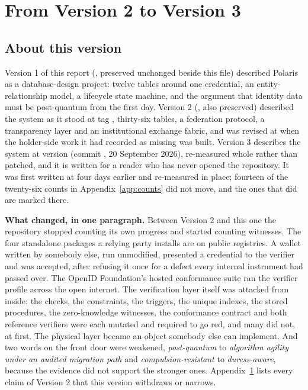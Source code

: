 \section{From Version 2 to Version 3}
\label{app:from-v2}

\subsection*{About this version}

Version 1 of this report (, preserved unchanged beside this
file) described Polaris as a database-design project: twelve tables around one credential, an
entity-relationship model, a lifecycle state machine, and the argument that identity data must be
post-quantum from the first day. Version 2 (, also preserved)
described the system as it stood at tag , thirty-six tables, a federation protocol, a
transparency layer and an institutional exchange fabric, and was revised at  when the
holder-side work it had recorded as missing was built. Version 3 describes the system at version
 (commit , 20 September 2026), re-measured whole rather than patched,
and it is written for a reader who has never opened the repository. It was first written at
 four days earlier and re-measured in place; fourteen of the twenty-six counts in
Appendix~\ref{app:counts} did not move, and the ones that did are marked there.

\textbf{What changed, in one paragraph.} Between Version 2 and this one the repository stopped
counting its own progress and started counting witnesses. The four standalone packages a relying
party installs are on public registries. A wallet written by somebody else, run unmodified,
presented a credential to the verifier and was accepted, after refusing it once for a defect every
internal instrument had passed over. The OpenID Foundation's hosted conformance suite ran the
verifier profile across the open internet. The verification layer itself was attacked from inside:
the checks, the constraints, the triggers, the unique indexes, the stored procedures, the zero-knowledge
witnesses, the conformance contract and both reference verifiers were each mutated and required to
go red, and many did not, at first. The physical layer became an object somebody else can implement.
And two words on the front door were weakened, \emph{post-quantum} to \emph{algorithm agility under an
audited migration path} and \emph{compulsion-resistant} to \emph{duress-aware}, because the evidence
did not support the stronger ones. Appendix~\ref{app:from-v2} lists every claim of Version 2 that this
version withdraws or narrows.

